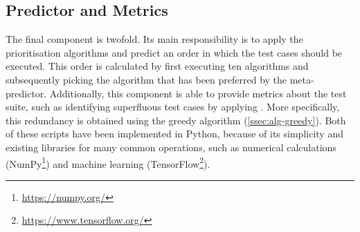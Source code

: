 \subsection{Predictor and Metrics}\label{ssec:velocity-predictor}
The final component is twofold. Its main responsibility is to apply the prioritisation algorithms and predict an order in which the test cases should be executed. This order is calculated by first executing ten algorithms and subsequently picking the algorithm that has been preferred by the meta-predictor. Additionally, this component is able to provide metrics about the test suite, such as identifying superfluous test cases by applying \tsm{}. More specifically, this redundancy is obtained using the greedy algorithm (\autoref{ssec:alg-greedy}). Both of these scripts have been implemented in Python, because of its simplicity and existing libraries for many common operations, such as numerical calculations (NumPy\footnote{\url{https://numpy.org/}}) and machine learning (TensorFlow\footnote{\url{https://www.tensorflow.org/}}).